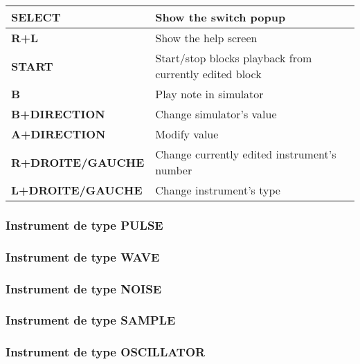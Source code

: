 \tablelasttail{\hline}
\begin{supertabular}{|l|p{11cm}|}
\hline
    {\bf SELECT} & Show the switch popup \\
    \hline
    {\bf R+L} & Show the help screen \\
    \hline
    {\bf START} & Start/stop blocks playback from currently edited block \\
    \hline
    {\bf B} & Play note in simulator \\
    \hline
    {\bf B+DIRECTION} & Change simulator's value \\
    \hline
    {\bf A+DIRECTION} & Modify value \\
    \hline
    {\bf R+DROITE/GAUCHE} & Change currently edited instrument's number \\
    \hline
    {\bf L+DROITE/GAUCHE} & Change instrument's type \\
\hline
\end{supertabular}

\subsubsection{Instrument de type PULSE}


\subsubsection{Instrument de type WAVE}


\subsubsection{Instrument de type NOISE}


\subsubsection{Instrument de type SAMPLE}


\subsubsection{Instrument de type OSCILLATOR}


